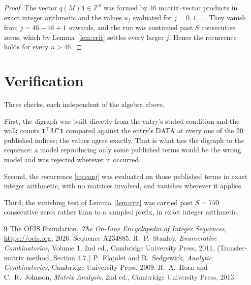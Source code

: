 \documentclass[11pt,a4paper]{article}
\theoremstyle{plain}
\theoremstyle{definition}
\begin{document}
\begin{proof}
The vector $q(M)\mathbf{1}\in\mathbb{Z}^{S}$ was formed by $46$ matrix--vector
products in exact integer arithmetic and the values $u_j$ evaluated for
$j=0,1,\dots$. They vanish from $j=46-46+1$ onwards, and the run was continued past
$S$ consecutive zeros, which by Lemma~\ref{lem:crit} settles every larger $j$. Hence the
recurrence holds for every $n>46$.
\end{proof}

\section{Verification}

Three checks, each independent of the algebra above.

First, the digraph was built directly from the entry's stated condition and the walk counts
$\mathbf{1}^{\!\top}M^{n}\mathbf{1}$ compared against the entry's DATA at every one of
the $20$ published indices; the values agree exactly. That is what ties the digraph to
the sequence: a model reproducing only some published terms would be the wrong model and
was rejected wherever it occurred.

Second, the recurrence \eqref{eq:conj} was evaluated on those published terms in exact
integer arithmetic, with no matrices involved, and vanishes wherever it applies.

Third, the vanishing test of Lemma~\ref{lem:crit} was carried past $S=750$ consecutive
zeros rather than to a sampled prefix, in exact integer arithmetic.

\begin{thebibliography}{9}
 The OEIS Foundation, \emph{The On-Line Encyclopedia of Integer
Sequences}, \url{https://oeis.org}, 2026. Sequence A234885.
 R.~P.~Stanley, \emph{Enumerative Combinatorics}, Volume 1, 2nd ed.,
Cambridge University Press, 2011. (Transfer-matrix method, Section 4.7.)
 P.~Flajolet and R.~Sedgewick, \emph{Analytic Combinatorics}, Cambridge
University Press, 2009.
 R.~A.~Horn and C.~R.~Johnson, \emph{Matrix Analysis}, 2nd ed., Cambridge
University Press, 2013.
\end{thebibliography}
\end{document}
